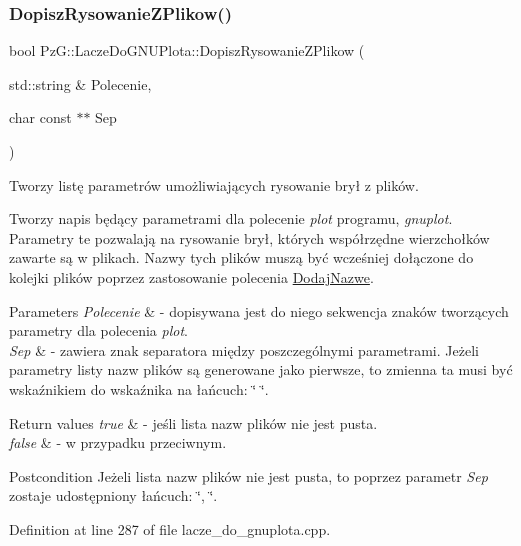 \subsubsection{\texorpdfstring{Dopisz\+Rysowanie\+Z\+Plikow()}{DopiszRysowanieZPlikow()}}
{\footnotesize\ttfamily bool Pz\+G\+::\+Lacze\+Do\+G\+N\+U\+Plota\+::\+Dopisz\+Rysowanie\+Z\+Plikow (\begin{DoxyParamCaption}\item[{std\+::string \&}]{Polecenie,  }\item[{char const $\ast$$\ast$}]{Sep }\end{DoxyParamCaption})}



Tworzy listę parametrów umożliwiających rysowanie brył z plików. 

Tworzy napis będący parametrami dla polecenie {\itshape plot} programu, {\itshape gnuplot}. Parametry te pozwalają na rysowanie brył, których współrzędne wierzchołków zawarte są w plikach. Nazwy tych plików muszą być wcześniej dołączone do kolejki plików poprzez zastosowanie polecenia \hyperlink{}{Dodaj\+Nazwe}.


\begin{DoxyParams}{Parameters}
{\em Polecenie} & -\/ dopisywana jest do niego sekwencja znaków tworzących parametry dla polecenia {\itshape plot}. \\
\hline
{\em Sep} & -\/ zawiera znak separatora między poszczególnymi parametrami. Jeżeli parametry listy nazw plików są generowane jako pierwsze, to zmienna ta musi być wskaźnikiem do wskaźnika na łańcuch\+: \char`\"{} \char`\"{}. \\
\hline
\end{DoxyParams}

\begin{DoxyRetVals}{Return values}
{\em true} & -\/ jeśli lista nazw plików nie jest pusta. \\
\hline
{\em false} & -\/ w przypadku przeciwnym. \\
\hline
\end{DoxyRetVals}
\begin{DoxyPostcond}{Postcondition}
Jeżeli lista nazw plików nie jest pusta, to poprzez parametr {\itshape Sep} zostaje udostępniony łańcuch\+: \char`\"{}, \char`\"{}. 
\end{DoxyPostcond}


Definition at line 287 of file lacze\+\_\+do\+\_\+gnuplota.\+cpp.

\mbox{\label{class_pz_g_1_1_lacze_do_g_n_u_plota_a200ce6bdb980c314a9eafe49e8f2dd5e}} 
